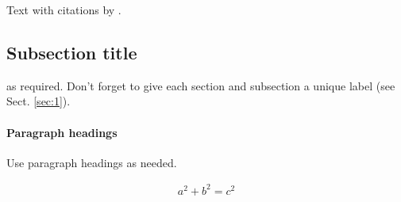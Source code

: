 \documentclass[smallextended]{svjour3}       %
\begin{document}
Text with citations by \cite{Galyardt14mmm}.

\hypertarget{sec:2}{%
\subsection{Subsection title}\label{sec:2}}

as required. Don't forget to give each section and subsection a unique
label (see Sect. \ref{sec:1}).

\hypertarget{paragraph-headings}{%
\paragraph{Paragraph headings}\label{paragraph-headings}}

Use paragraph headings as needed.

\begin{align}
a^2+b^2=c^2
\end{align}




\end{document}
